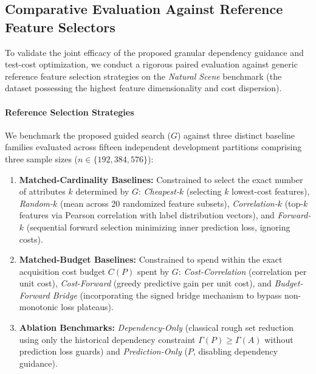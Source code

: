 \subsection{Comparative Evaluation Against Reference Feature Selectors}
\label{sec:paper-baselines}

To validate the joint efficacy of the proposed granular dependency guidance and test-cost optimization, we conduct a rigorous paired evaluation against generic reference feature selection strategies on the \textit{Natural Scene} benchmark (the dataset possessing the highest feature dimensionality and cost dispersion).

\paragraph{Reference Selection Strategies}
We benchmark the proposed guided search ($G$) against three distinct baseline families evaluated across fifteen independent development partitions comprising three sample sizes ($n \in \{192, 384, 576\}$):
\begin{enumerate}[label=(\arabic*), leftmargin=*]
	\item \textbf{Matched-Cardinality Baselines:} Constrained to select the exact number of attributes $k$ determined by $G$: \textit{Cheapest-$k$} (selecting $k$ lowest-cost features), \textit{Random-$k$} (mean across 20 randomized feature subsets), \textit{Correlation-$k$} (top-$k$ features via Pearson correlation with label distribution vectors), and \textit{Forward-$k$} (sequential forward selection minimizing inner prediction loss, ignoring costs).
	\item \textbf{Matched-Budget Baselines:} Constrained to spend within the exact acquisition cost budget $C(P)$ spent by $G$: \textit{Cost-Correlation} (correlation per unit cost), \textit{Cost-Forward} (greedy predictive gain per unit cost), and \textit{Budget-Forward Bridge} (incorporating the signed bridge mechanism to bypass non-monotonic loss plateaus).
	\item \textbf{Ablation Benchmarks:} \textit{Dependency-Only} (classical rough set reduction using only the historical dependency constraint $\Gamma(P) \ge \Gamma(A)$ without prediction loss guards) and \textit{Prediction-Only} ($P$, disabling dependency guidance).
\end{enumerate}

